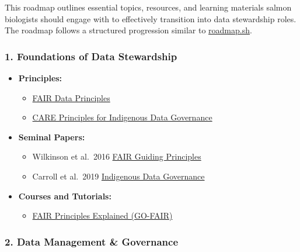\documentclass[
  letterpaper,
  DIV=11,
  numbers=noendperiod]{scrartcl}
\providecommand{\tightlist}{%
  \setlength{\itemsep}{0pt}\setlength{\parskip}{0pt}}\usepackage{longtable,booktabs,array}
\begin{document}
This roadmap outlines essential topics, resources, and learning
materials salmon biologists should engage with to effectively transition
into data stewardship roles. The roadmap follows a structured
progression similar to \href{https://roadmap.sh}{roadmap.sh}.

\subsubsection{1. Foundations of Data
Stewardship}\label{foundations-of-data-stewardship}

\begin{itemize}
\tightlist
\item
  \textbf{Principles:}

  \begin{itemize}
  \tightlist
  \item
    \href{https://www.go-fair.org/fair-principles/}{FAIR Data
    Principles}
  \item
    \href{https://www.gida-global.org/care}{CARE Principles for
    Indigenous Data Governance}
  \end{itemize}
\item
  \textbf{Seminal Papers:}

  \begin{itemize}
  \tightlist
  \item
    Wilkinson et al.~2016
    \href{https://doi.org/10.1038/sdata.2016.18}{FAIR Guiding
    Principles}
  \item
    Carroll et al.~2019
    \href{https://doi.org/10.5334/dsj-2019-031}{Indigenous Data
    Governance}
  \end{itemize}
\item
  \textbf{Courses and Tutorials:}

  \begin{itemize}
  \tightlist
  \item
    \href{https://www.go-fair.org/resources/videos/fair-principles-explained/}{FAIR
    Principles Explained (GO-FAIR)}
  \end{itemize}
\end{itemize}

\subsubsection{2. Data Management \&
Governance}\label{data-management-governance}
\end{document}
